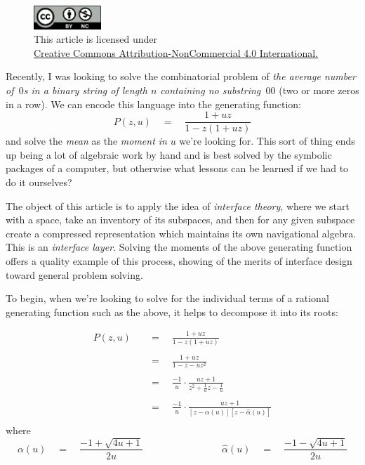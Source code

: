 \documentclass[twoside]{article}
\newcommand{\equals}{\ensuremath{\quad =\quad}}
\newcommand{\fourqquad}{\ensuremath{\qquad\qquad\qquad\qquad}}
\newcommand{\alphahat}{\ensuremath{\hat{\alpha}}}
\begin{document}
\begin{figure}[h]
\centering
\includegraphics[width=1in]{cc-by-nc.png}\\[0.1in]
\tiny This article is licensed under \\
\href{http://creativecommons.org/licenses/by-nc/4.0/}
{Creative Commons Attribution-NonCommercial 4.0 International.}\\[0.3in]
\end{figure}

Recently, I was looking to solve the combinatorial problem of \emph{the average number of \,$ 0 $s in a binary string of length
$ n $ containing no substring \,$ 00 $} (two or more zeros in a row). We can encode this language into the generating function:
$$ P(z,u)\quad=\quad\frac{1+uz}{1-z(1+uz)} $$
and solve the \emph{mean} as the \emph{moment in} $ u $ we're looking for. This sort of thing ends up being a lot of algebraic
work by hand and is best solved by the symbolic packages of a computer, but otherwise what lessons can be learned if we had to
do it ourselves?

The object of this article is to apply the idea of \emph{interface theory}, where we start with a space, take an inventory
of its subspaces, and then for any given subspace create a compressed representation which maintains its own navigational algebra.
This is an \emph{interface layer}. Solving the moments of the above generating function offers a quality example of this process,
showing of the merits of interface design toward general problem solving.

To begin, when we're looking to solve for the individual terms of a rational generating function such as the above, it helps to decompose
it into its roots:

\begin{align*}
P(z,u)	& \equals \frac{1+uz}{1-z(1+uz)}						\\
											\\
	& \equals \frac{1+uz}{1-z-uz^2}							\\
											\\
	& \equals \frac{-1}{u} \cdot \frac{uz+1}{z^2+\frac{1}{u}z-\frac{1}{u}}		\\
											\\
	& \equals \frac{-1}{u} \cdot \frac{uz+1}{[z-\alpha(u)][z-\alphahat(u)]}		\\
\end{align*}
where
$$ \alpha(u) \equals \frac{-1+\sqrt{4u+1}}{2u} \fourqquad \alphahat(u) \equals \frac{-1-\sqrt{4u+1}}{2u} $$
\end{document}
